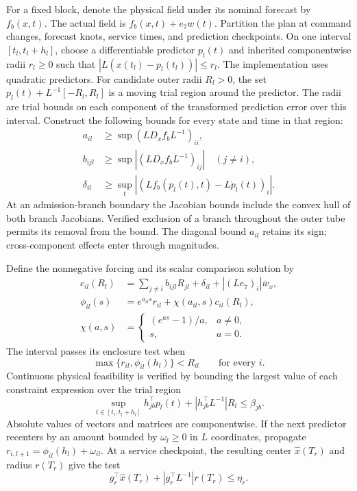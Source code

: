 \documentclass[journal,10pt]{IEEEtran}
\begin{document}
For a fixed block, denote the physical field under its nominal forecast by
$f_b(x,t)$. The actual field is $f_b(x,t)+e_7w(t)$. Partition the plan at
command changes, forecast knots, service times, and prediction checkpoints.
On one interval $[t_l,t_l+h_l]$, choose a differentiable predictor $p_l(t)$
and inherited componentwise radii $r_l\ge0$ such that
$|L(x(t_l)-p_l(t_l))|\le r_l$. The implementation uses quadratic predictors.
For candidate outer radii $R_l>0$, the set
$p_l(t)+L^{-1}[-R_l,R_l]$ is a moving trial region around the predictor.
The radii are trial bounds on each component of the transformed prediction
error over this interval. Construct
the following bounds for every state and time in that region:
\begin{equation}
 \begin{aligned}
 a_{il}&\ge\sup (L D_xf_b L^{-1})_{ii},\\
 b_{ijl}&\ge\sup |(L D_xf_b L^{-1})_{ij}|\quad(j\ne i),\\
 \delta_{il}&\ge\sup_t |(L f_b(p_l(t),t)-L\dot p_l(t))_i|.
 \end{aligned}
 \label{eq:new-local-bounds}
\end{equation}
At an admission-branch boundary the Jacobian bounds include the convex hull
of both branch Jacobians. Verified exclusion of a branch throughout the
outer tube permits its removal from the bound. The diagonal bound $a_{il}$
retains its sign; cross-component effects enter through magnitudes.

Define the nonnegative forcing and its scalar comparison solution by
\begin{align}
 c_{il}(R_l)&=\sum_{j\ne i}b_{ijl}R_{jl}
                 +\delta_{il}+|(Le_7)_i|\bar w_x,\nonumber\\
 \phi_{il}(s)&=e^{a_{il}s}r_{il}
                  +\chi(a_{il},s)c_{il}(R_l),\nonumber\\
 \chi(a,s)&=\begin{cases}(e^{as}-1)/a,&a\ne0,\\s,&a=0.\end{cases}
 \label{eq:new-component-comparison}
\end{align}
The interval passes its enclosure test when
\begin{equation}
 \max\{r_{il},\phi_{il}(h_l)\}<R_{il}
 \qquad\text{for every }i.
 \label{eq:new-self-inclusion}
\end{equation}
Continuous physical feasibility is verified by bounding the largest
value of each constraint expression over the trial region
\begin{equation}
 \sup_{t\in[t_l,t_l+h_l]}h_{jb}^{\top}p_l(t)
             +|h_{jb}^{\top}L^{-1}|R_l\le\beta_{jb}.
 \label{eq:new-affine-support}
\end{equation}
Absolute values of vectors and matrices are componentwise. If the next
predictor recenters by an amount bounded by $\omega_l\ge0$ in $L$ coordinates,
propagate $r_{i,l+1}=\phi_{il}(h_l)+\omega_{il}$. At a service checkpoint,
the resulting center $\widehat x(T_r)$ and radius $r(T_r)$ give the test
\begin{equation}
 g_r^{\top}\widehat x(T_r)+|g_r^{\top}L^{-1}|r(T_r)\le\eta_r.
 \label{eq:new-service-support}
\end{equation}
\end{document}
